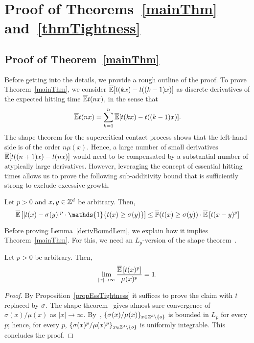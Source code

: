 \section{Proof of Theorems~\ref{mainThm} and~\ref{thmTightness}}
\label{thmSec}

\subsection{Proof of Theorem~\ref{mainThm}}

Before getting into the details, we provide a rough outline of the proof. To prove Theorem~\ref{mainThm}, we consider $\overline{\mathbb{E}}[t(kx) - t((k-1)x)]$ as discrete derivatives of the expected hitting time 
$\overline{\mathbb{E}}t(n x)$, in the sense that 
$$\overline{\mathbb{E}}t(n x)  = \sum_{k = 1}^n \overline{\mathbb{E}}[t(k x) - t((k-1)  x)].$$
The shape theorem for the supercritical contact process shows that the left-hand side is of the order $n\mu(x)$. Hence, a large number of small derivatives $\overline{\mathbb{E}}[t((n+1) x) - t(n x)]$ would need to be compensated by a substantial number of atypically large derivatives. However, leveraging the concept of essential hitting times allows us to prove the following sub-additivity bound that is sufficiently strong to exclude excessive growth. 



\begin{lemma}
	\label{derivBoundLem}
	Let $p > 0$ and $x, y \in {\mathbb{Z}^d}$ be arbitrary. Then, 
	$$\oE\left[|t(x) - \sigma(y)|^p\cdot \mathds{1}\{\t(x) \ge \s(y) \} \right] \leq \oP(\t(x) \ge \s(y)) \cdot \oE \left[t(x-y)^p \right] $$
\end{lemma}

Before proving Lemma~\ref{derivBoundLem}, we explain how it implies Theorem~\ref{mainThm}. For this, we need an $L_p$-version of the shape theorem~\cite[Theorem 3]{GaretMarch12}.
\begin{lemma}
	\label{shapeThm}
	Let $p > 0$ be arbitrary. Then, $$\lim_{|x| \to \infty}\frac{\overline{\mathbb{E}}\left[t(x)^p \right]}{\mu(x)^p} = 1.$$
\end{lemma}
\begin{proof}
By Proposition~\ref{propEssTightness} it suffices to prove the claim with $t$ replaced by $\sigma$. The shape theorem~\cite[Theorem 3]{GaretMarch12} gives almost sure convergence of $\sigma(x)/\mu(x)$ as $|x| \to \infty$. By~\cite[Theorem 15]{GaretMarch14}, $\{\sigma(x)/\mu(x)\}_{x \in {\mathbb{Z}^d} \setminus \{o\}}$ is bounded in $L_p$ for every $p$; hence, for every $p$, $\{\sigma(x)^p/\mu(x)^p\}_{x \in {\mathbb{Z}^d} \setminus \{o\}}$ is uniformly integrable. This concludes the proof.
\end{proof}

